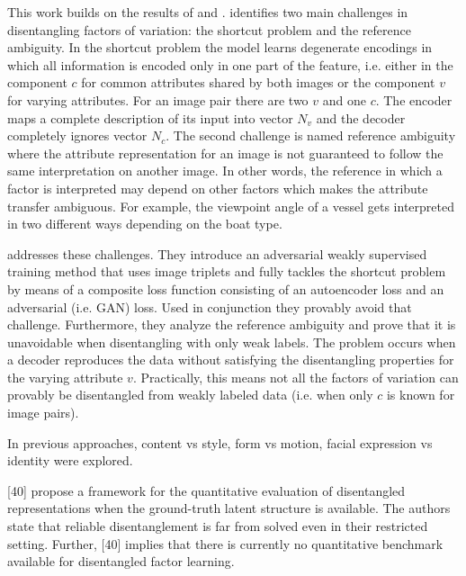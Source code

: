 \documentclass[12pt,a4paper]{article}
\begin{document}
This work builds on the results of \cite{1711.07410} and \cite{1711.02245}.
\cite{1711.02245} identifies two main challenges in disentangling factors of variation: the shortcut problem and the reference ambiguity. In the shortcut problem the model learns degenerate encodings in which all information is encoded only in one part of the feature, i.e. either in the component $c$ for common attributes shared by both images or the component $v$ for varying attributes. For an image pair there are two $v$ and one $c$. The encoder maps a complete description of its input into vector $N_v$ and the decoder completely ignores vector $N_c$.
\newline The second challenge is named reference ambiguity where the attribute representation for an image is not guaranteed to follow the same interpretation on another image. In other words, the reference in which a factor is interpreted may depend on other factors which makes the attribute transfer ambiguous. For example, the viewpoint angle of a vessel gets interpreted in two different ways depending on the boat type.
\par[Understanding Degeneracies and Ambiguities in Attribute Transfer] addresses these challenges. They introduce an adversarial weakly supervised training method that uses image triplets and fully tackles the shortcut problem by means of a composite loss function consisting of an autoencoder loss and an adversarial (i.e. GAN) loss. Used in conjunction they provably avoid that challenge. 
Furthermore, they analyze the reference ambiguity and prove that it is unavoidable when disentangling with only weak labels. The problem occurs when a decoder reproduces the data without satisfying the disentangling properties for the varying attribute $v$. Practically, this means not all the factors of variation can provably be disentangled from weakly labeled data (i.e. when only $c$ is known for image pairs).    

In previous approaches, content vs style, form vs motion, facial expression vs identity were explored.

[40] propose a framework for the quantitative evaluation of disentangled representations when the ground-truth latent structure is available. The authors state that reliable disentanglement is far from solved even in their restricted setting. Further, [40] implies that there is currently no quantitative benchmark available for disentangled factor learning.
\end{document}
